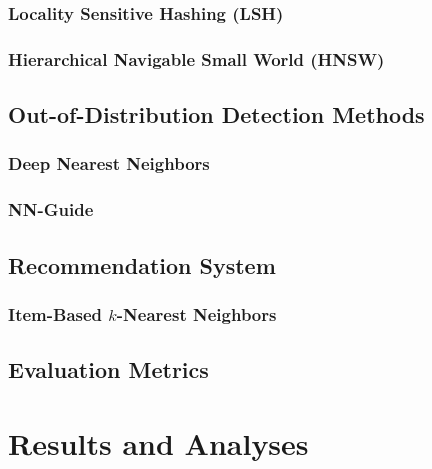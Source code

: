 \documentclass[12pt, a4paper]{report}
\begin{document}
\subsection{Locality Sensitive Hashing (LSH)}



\subsection{Hierarchical Navigable Small World (HNSW)}



\section{Out-of-Distribution Detection Methods}
\label{sec:ood_methods}

\subsection{Deep Nearest Neighbors}



\subsection{NN-Guide}



\section{Recommendation System}
\label{sec:rec_system}

\subsection{Item-Based $k$-Nearest Neighbors}



\section{Evaluation Metrics}



\chapter{Results and Analyses}
\end{document}
